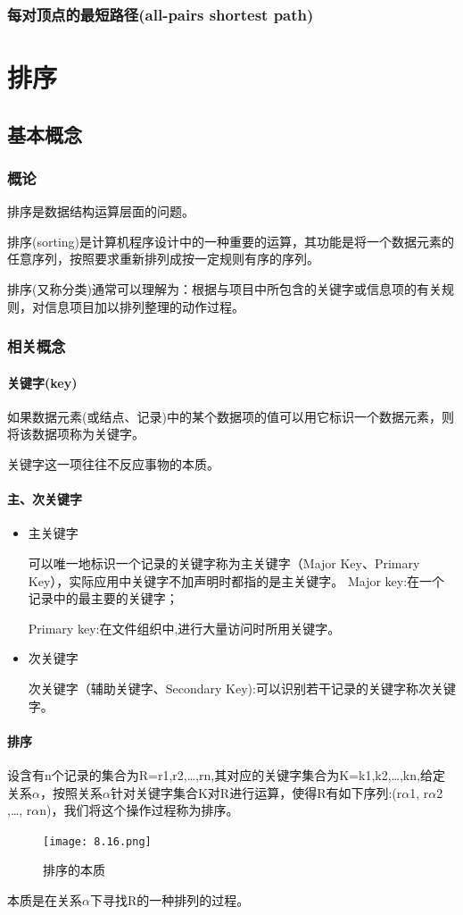\documentclass[AutoFakeBold]{LZUThesis2007}
\begin{document}
		\subsection{每对顶点的最短路径(all-pairs shortest path)}

\chapter{排序}
	\section{基本概念}
		\subsection{概论}
排序是数据结构运算层面的问题。

排序(sorting)是计算机程序设计中的一种重要的运算，其功能是将一个数据元素的任意序列，按照要求重新排列成按一定规则有序的序列。

排序(又称分类)通常可以理解为：根据与项目中所包含的关键字或信息项的有关规则，对信息项目加以排列整理的动作过程。
		\subsection{相关概念}
			\subsubsection{关键字(key)}
如果数据元素(或结点、记录)中的某个数据项的值可以用它标识一个数据元素，则将该数据项称为关键字。

关键字这一项往往不反应事物的本质。
			\subsubsection{主、次关键字}
\begin{itemize}
	\item 主关键字

可以唯一地标识一个记录的关键字称为主关键字（Major Key、Primary Key），实际应用中关键字不加声明时都指的是主关键字。
        Major key:在一个记录中的最主要的关键字；

        Primary key:在文件组织中,进行大量访问时所用关键字。

	\item 次关键字

次关键字（辅助关键字、Secondary Key):可以识别若干记录的关键字称次关键字。
\end{itemize}
			\subsubsection{排序}
设含有n个记录的集合为R={r1,r2,…,rn},其对应的关键字集合为K={k1,k2,…,kn},给定关系$\alpha$，按照关系$\alpha$针对关键字集合K对R进行运算，使得R有如下序列:(r$\alpha$1, r$\alpha$2 ,…, r$\alpha$n)，我们将这个操作过程称为排序。
\begin{figure}[H]
    \centering
    \texttt{[image: 8.16.png]}
    \caption{排序的本质}
    \label{fig_install_texlive}
\end{figure}
本质是在关系$\alpha$下寻找R的一种排列的过程。
\end{document}
